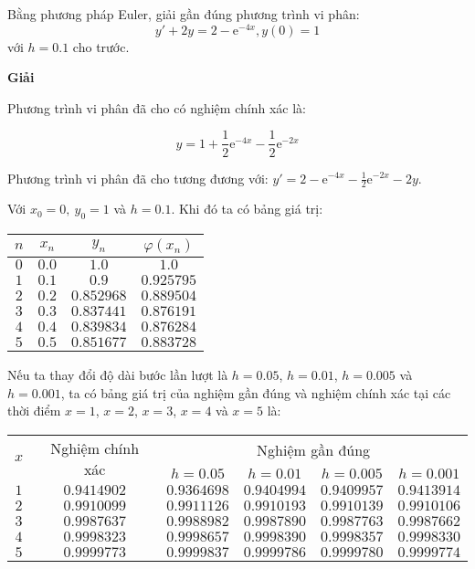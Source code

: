\begin{example}
	Bằng phương pháp Euler, giải gần đúng phương trình vi phân:
	$$y'+2y=2-{\mathrm{e}^{-4x}},y(0)=1$$
	với $h=0.1$ cho trước.\par
\end{example}

\textbf{Giải}\par
Phương trình vi phân đã cho có nghiệm chính xác là:\par
$$y=1+\frac{1}{2}{\mathrm{e}^{-4x}}-\frac{1}{2}{\mathrm{e}^{-2x}}$$

Phương trình vi phân đã cho tương đương với: $y'=2-\mathrm{e}^{-4x}-\frac12\mathrm{e}^{-2x}-2y$.\par
Với $x_0=0,~y_0=1$ và $h=0.1$. Khi đó ta có bảng giá trị:
\begin{longtable}{|c|c|c|c|}\hline
	$n$ & $x_n$ & $y_n$      & $\varphi(x_n)$ \\\hline
	\endhead
	$0$ & $0.0$ & $1.0$      & $1.0$      \\\hline
	$1$ & $0.1$ & $0.9$      & $0.925795$ \\\hline
	$2$ & $0.2$ & $0.852968$ & $0.889504$ \\\hline
	$3$ & $0.3$ & $0.837441$ & $0.876191$ \\\hline
	$4$ & $0.4$ & $0.839834$ & $0.876284$ \\\hline
	$5$ & $0.5$ & $0.851677$ & $0.883728$ \\\hline
\end{longtable}

Nếu ta thay đổi độ dài bước lần lượt là $h=0.05$, $h=0.01$, $h=0.005$ và $h=0.001$, ta có bảng giá trị của nghiệm gần đúng và nghiệm chính xác tại các thời điểm $x=1$, $x=2$, $x=3$, $x=4$ và $x=5$ là:\par
\begin{longtable}{|c|c|c|c|c|c|}\hline
	\multirow{2}{*}{$x$} & \multirow{2}{*}{Nghiệm chính xác} & \multicolumn{4}{c|}{Nghiệm gần đúng}\\\cline{3-6}
	    &             & $h=0.05$    & $h=0.01$    & $h=0.005$   & $h=0.001$   \\\hline
	\endhead
	$1$ & $0.9414902$ & $0.9364698$ & $0.9404994$ & $0.9409957$ & $0.9413914$ \\\hline
	$2$ & $0.9910099$ & $0.9911126$ & $0.9910193$ & $0.9910139$ & $0.9910106$ \\\hline
	$3$ & $0.9987637$ & $0.9988982$ & $0.9987890$ & $0.9987763$ & $0.9987662$ \\\hline
	$4$ & $0.9998323$ & $0.9998657$ & $0.9998390$ & $0.9998357$ & $0.9998330$ \\\hline
	$5$ & $0.9999773$ & $0.9999837$ & $0.9999786$ & $0.9999780$ & $0.9999774$ \\\hline
\end{longtable}

